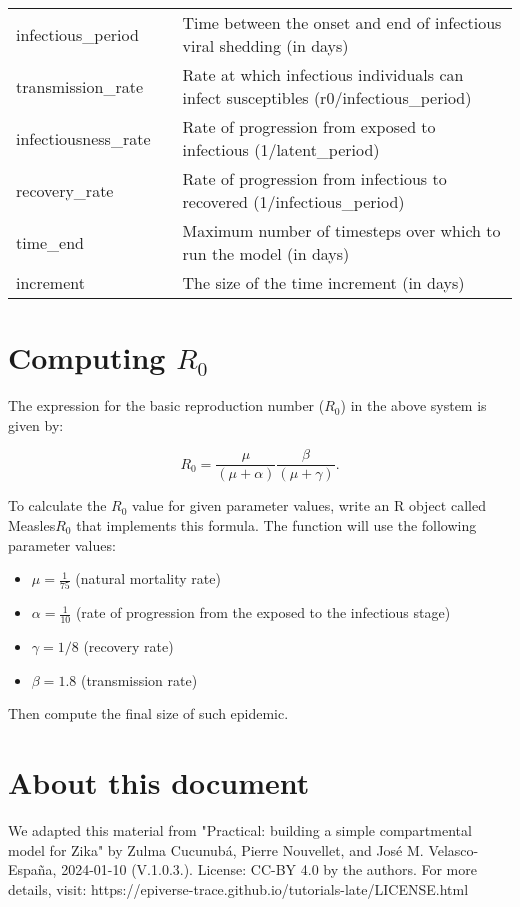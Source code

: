 \documentclass{article}
\begin{document}
\begin{table}[htb]
\begin{tabular}{@{}lll@{}}
		infectious\_period   & \underline{\hspace{1cm}} & Time between the onset and end of infectious viral shedding (in days)                \\
		transmission\_rate   & \underline{\hspace{1cm}}  & Rate at which infectious individuals can infect susceptibles (r0/infectious\_period) \\
		infectiousness\_rate &  \underline{\hspace{1cm}}  & Rate of progression from exposed to infectious (1/latent\_period)                    \\
		recovery\_rate       & \underline{\hspace{1cm}}  & Rate of progression from infectious to recovered (1/infectious\_period)              \\
		time\_end            & \underline{\hspace{1cm}} & Maximum number of timesteps over which to run the model (in days)                     \\
		increment            & \underline{\hspace{1cm}}  & The size of the time increment (in days)                                              \\ \bottomrule
	\end{tabular}
\end{table}

\section{Computing $R_0$}
The expression for the basic reproduction number ($R_0$) in the above system  is given by:

\begin{equation*} R_0 = \frac{\mu}{(\mu + \alpha)} \frac{\beta}{(\mu + \gamma)}. \end{equation*}

To calculate the $R_0$ value for given parameter values,  write an R object
called Measles$R_0$ that implements this formula. The function will use the following parameter values:

    \begin{itemize}
        \item $\mu = \frac{1}{75}$ (natural mortality rate)
        \item $\alpha = \frac{1}{10}$ (rate of progression from the exposed to the infectious stage)
        \item $\gamma = 1/8$ (recovery rate)
        \item $\beta = 1.8$ (transmission rate)
    \end{itemize}
Then compute the final size of such epidemic.

\section{About this document}
We adapted this material from "Practical: building a simple compartmental model for Zika" by Zulma Cucunubá, Pierre Nouvellet, and José M. Velasco-España, 2024-01-10 (V.1.0.3.).
License: CC-BY 4.0 by the authors.
For more details, visit: https://epiverse-trace.github.io/tutorials-late/LICENSE.html
\end{document}
